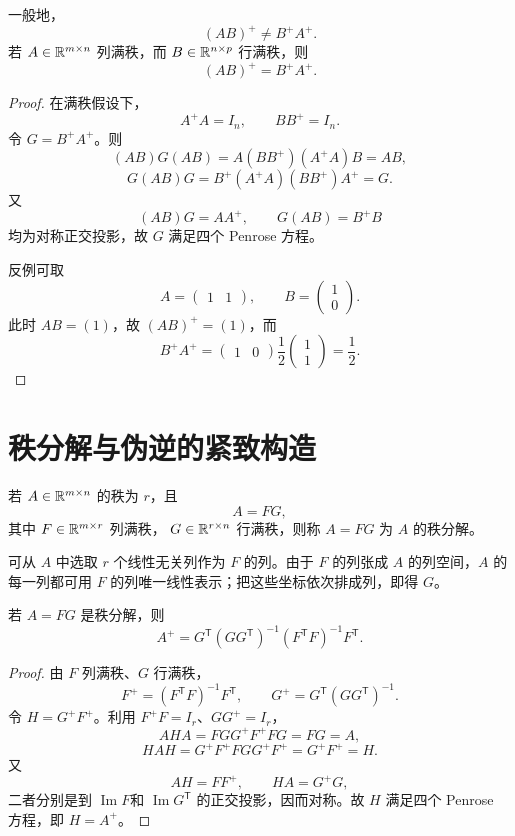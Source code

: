 \begin{proposition}[伪逆的逆序律]
一般地，
\[
(AB)^+\ne B^+A^+.
\]
若 $A\in\mathbb{R}^{m\times n}$ 列满秩，而
$B\in\mathbb{R}^{n\times p}$ 行满秩，则
\[
(AB)^+=B^+A^+.
\]
\end{proposition}
\begin{proof}
在满秩假设下，
\[
A^+A=I_n,
\qquad
BB^+=I_n.
\]
令 $G=B^+A^+$。则
\[
(AB)G(AB)=A(BB^+)(A^+A)B=AB,
\]
\[
G(AB)G=B^+(A^+A)(BB^+)A^+=G.
\]
又
\[
(AB)G=AA^+,
\qquad
G(AB)=B^+B
\]
均为对称正交投影，故 $G$ 满足四个 Penrose 方程。

反例可取
\[
A=\begin{pmatrix}1&1\end{pmatrix},
\qquad
B=\begin{pmatrix}1\\0\end{pmatrix}.
\]
此时 $AB=(1)$，故 $(AB)^+=(1)$，而
\[
B^+A^+
=\begin{pmatrix}1&0\end{pmatrix}
\frac12\begin{pmatrix}1\\1\end{pmatrix}
=\frac12.
\]
\end{proof}

\section{秩分解与伪逆的紧致构造}

\begin{definition}[秩分解]
若 $A\in\mathbb{R}^{m\times n}$ 的秩为 $r$，且
\[
A=FG,
\]
其中 $F\in\mathbb{R}^{m\times r}$ 列满秩，
$G\in\mathbb{R}^{r\times n}$ 行满秩，则称 $A=FG$ 为 $A$ 的秩分解。
\end{definition}

可从 $A$ 中选取 $r$ 个线性无关列作为 $F$ 的列。由于 $F$ 的列张成 $A$ 的列空间，$A$ 的每一列都可用 $F$ 的列唯一线性表示；把这些坐标依次排成列，即得 $G$。

\begin{theorem}[秩分解给出的伪逆公式]
若 $A=FG$ 是秩分解，则
\[
\boxed{
A^+=G^{\mathsf T}(GG^{\mathsf T})^{-1}
(F^{\mathsf T}F)^{-1}F^{\mathsf T}.}
\]
\end{theorem}
\begin{proof}
由 $F$ 列满秩、$G$ 行满秩，
\[
F^+=(F^{\mathsf T}F)^{-1}F^{\mathsf T},
\qquad
G^+=G^{\mathsf T}(GG^{\mathsf T})^{-1}.
\]
令 $H=G^+F^+$。利用
$F^+F=I_r$、$GG^+=I_r$，
\[
AHA=FGG^+F^+FG=FG=A,
\]
\[
HAH=G^+F^+FGG^+F^+=G^+F^+=H.
\]
又
\[
AH=FF^+,
\qquad
HA=G^+G,
\]
二者分别是到 $\operatorname{Im}F$和
$\operatorname{Im}G^{\mathsf T}$ 的正交投影，因而对称。故 $H$ 满足四个 Penrose 方程，即 $H=A^+$。
\end{proof}

